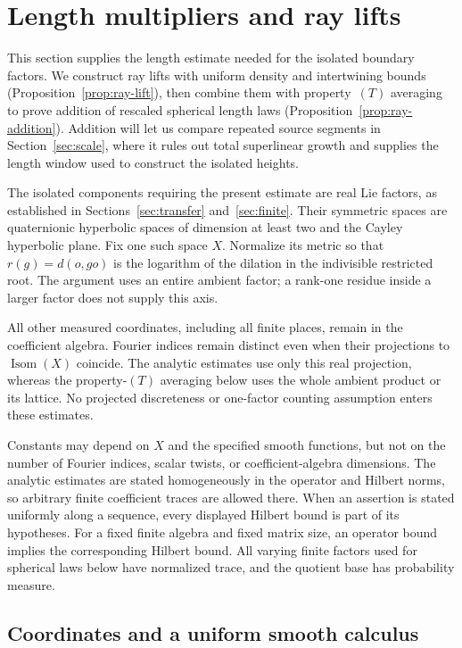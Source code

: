 \section{Length multipliers and ray lifts}\label{sec:ray}

This section supplies the length estimate needed for the isolated
boundary factors. We construct ray lifts with uniform density and
intertwining bounds (Proposition~\ref{prop:ray-lift}), then combine them
with property~$(T)$ averaging to prove addition of rescaled spherical
length laws (Proposition~\ref{prop:ray-addition}). Addition will let us
compare repeated source segments in Section~\ref{sec:scale}, where it
rules out total superlinear growth and supplies the length window used
to construct the isolated heights.

The isolated components requiring the present estimate are real Lie
factors, as established in Sections~\ref{sec:transfer}
and~\ref{sec:finite}.  Their symmetric spaces are quaternionic
hyperbolic spaces of dimension at least two and the Cayley hyperbolic
plane.  Fix one such space \(X\).  Normalize its metric so that
\(r(g)=d(o,go)\) is the logarithm of the dilation in the indivisible
restricted root.  The argument uses an entire ambient factor; a
rank-one residue inside a larger factor does not supply this axis.

All other measured coordinates, including all finite places, remain
in the coefficient algebra.  Fourier indices remain distinct even
when their projections to \(\operatorname{Isom}(X)\) coincide.
The analytic estimates use only this real projection, whereas the
property-\((T)\) averaging below uses the whole ambient product or
its lattice.  No projected discreteness or one-factor counting
assumption enters these estimates.

Constants may depend on \(X\) and the specified smooth functions,
but not on the number of Fourier indices, scalar twists, or
coefficient-algebra dimensions.  The analytic estimates are stated
homogeneously in the operator and Hilbert norms, so arbitrary finite
coefficient traces are allowed there.  When an assertion is stated
uniformly along a sequence, every displayed Hilbert bound is part of
its hypotheses.  For a fixed finite algebra and fixed matrix size,
an operator bound implies the corresponding Hilbert bound.  All
varying finite factors used for spherical laws below have normalized
trace, and the quotient base has probability measure.

\subsection{Coordinates and a uniform smooth calculus}

